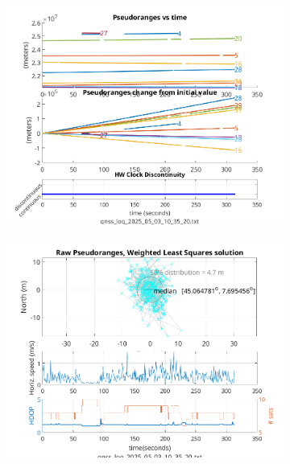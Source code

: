         \begin{figure}[h!]
            \centering
            \begin{subfigure}{0.23\textwidth}
                \includegraphics[width=\textwidth]{images/tests/Monte_Cappuccini/Spoofing/task5_figures/Samsung_A51_Monte_Cappuccini_fig1.png}
                \caption{}
            \end{subfigure}
            \hfill
            \begin{subfigure}{0.23\textwidth}
                \includegraphics[width=\textwidth]{images/tests/Monte_Cappuccini/Spoofing/task5_figures/Samsung_A51_Monte_Cappuccini_fig4.png}
                \caption{}
            \end{subfigure}
        \end{figure}


